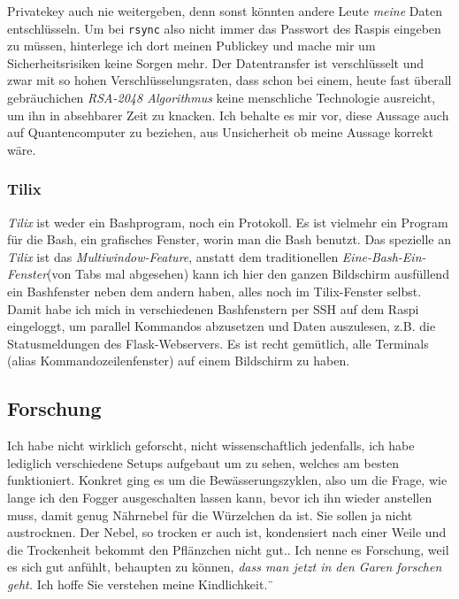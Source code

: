 \documentclass[12pt,titlepage,a4paper]{article}
\begin{document}
Privatekey auch nie weitergeben, denn sonst könnten andere Leute \textit{meine} Daten entschlüsseln. Um bei \verb/rsync/ also nicht immer das Passwort des Raspis eingeben zu müssen, hinterlege ich dort meinen Publickey und mache mir um Sicherheitsrisiken keine Sorgen mehr. Der Datentransfer ist verschlüsselt und zwar mit so hohen Verschlüsselungsraten, dass schon bei einem, heute fast überall gebräuchichen \textit{RSA-2048 Algorithmus} keine menschliche Technologie ausreicht, um ihn in absehbarer Zeit zu knacken. Ich behalte es mir vor, diese Aussage auch auf Quantencomputer zu beziehen, aus Unsicherheit ob meine Aussage korrekt wäre.

\subsubsection{Tilix}
\textit{Tilix} ist weder ein Bashprogram, noch ein Protokoll. Es ist vielmehr ein Program für die Bash, ein grafisches Fenster, worin man die Bash benutzt. Das spezielle an \textit{Tilix} ist das \textit{Multiwindow-Feature}, anstatt dem traditionellen \textit{Eine-Bash-Ein-Fenster}(von Tabs mal abgesehen) kann ich hier den ganzen Bildschirm ausfüllend ein Bashfenster neben dem andern haben, alles noch im Tilix-Fenster selbst. Damit habe ich mich in verschiedenen Bashfenstern per SSH auf dem Raspi eingeloggt, um parallel Kommandos abzusetzen und Daten auszulesen, z.B. die Statusmeldungen des Flask-Webservers. Es ist recht gemütlich, alle Terminals (alias Kommandozeilenfenster) auf einem Bildschirm zu haben.

\subsection{Forschung}
Ich habe nicht wirklich geforscht, nicht wissenschaftlich jedenfalls, ich habe lediglich verschiedene Setups aufgebaut um zu sehen, welches am besten funktioniert. Konkret ging es um die Bewässerungszyklen, also um die Frage, wie lange ich den Fogger ausgeschalten lassen kann, bevor ich ihn wieder anstellen muss, damit genug Nährnebel für die Würzelchen da ist. Sie sollen ja nicht austrocknen. Der Nebel, so trocken er auch ist, kondensiert nach einer Weile und die Trockenheit bekommt den Pflänzchen nicht gut.. Ich nenne es Forschung, weil es sich gut anfühlt, behaupten zu können, \textit{dass man jetzt in den Garen forschen geht.} Ich hoffe Sie verstehen meine Kindlichkeit.¨
\end{document}
